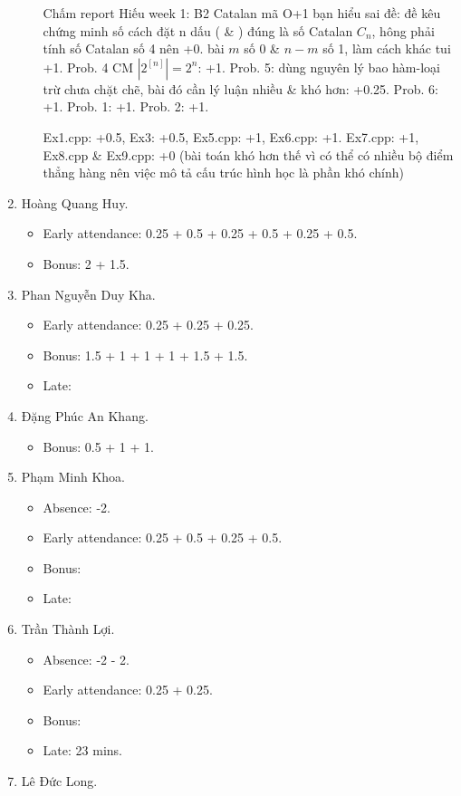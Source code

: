 \documentclass{article}
\begin{document}
\begin{enumerate}
\begin{itemize}
		Chấm report Hiếu week 1: B2 Catalan mã O+1 bạn hiểu sai đề: đề kêu chứng minh số cách đặt n dấu ( \& ) đúng là số Catalan $C_n$, hông phải tính số Catalan số 4 nên +0. bài $m$ số 0 \& $n - m$ số 1, làm cách khác tui +1. Prob. 4 CM $|2^[n]| =2^n$: +1. Prob. 5: dùng nguyên lý bao hàm-loại trừ chưa chặt chẽ, bài đó cần lý luận nhiều \& khó hơn: +0.25. Prob. 6: +1. Prob. 1: +1. Prob. 2: +1.
		
		Ex1.cpp: +0.5, Ex3: +0.5, Ex5.cpp: +1, Ex6.cpp: +1. Ex7.cpp: +1, Ex8.cpp \& Ex9.cpp: +0 (bài toán khó hơn thế vì có thể có nhiều bộ điểm thẳng hàng nên việc mô tả cấu trúc hình học là phần khó chính)
	\end{itemize}
	\item {\sc Hoàng Quang Huy.}
	\begin{itemize}
		\item Early attendance: 0.25 + 0.5 + 0.25 + 0.5 + 0.25 + 0.5.
		\item Bonus: 2 + 1.5.
	\end{itemize}
	\item {\sc Phan Nguyễn Duy Kha.}
	\begin{itemize}
		\item Early attendance: 0.25 + 0.25 + 0.25.
		\item Bonus: 1.5 + 1 + 1 + 1 + 1.5 + 1.5.
		\item Late: 
	\end{itemize}
	\item {\sc Đặng Phúc An Khang.}
	\begin{itemize}
		\item Bonus: 0.5 + 1 + 1.
	\end{itemize}
	\item {\sc Phạm Minh Khoa.}
	\begin{itemize}
		\item Absence: -2.
		\item Early attendance: 0.25 + 0.5 + 0.25 + 0.5.
		\item Bonus:
		\item Late: 
	\end{itemize}
	\item {\sc Trần Thành Lợi.}
	\begin{itemize}
		\item Absence: -2 - 2.
		\item Early attendance: 0.25 + 0.25.
		\item Bonus: 
		\item Late: 23 mins.
	\end{itemize}
	\item {\sc Lê Đức Long.}

\end{enumerate}
\end{document}

